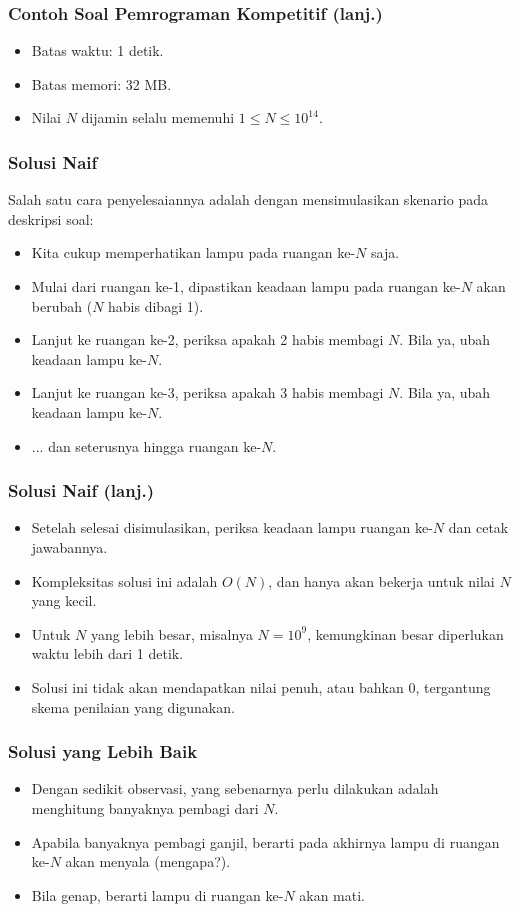 \begin{frame}
\frametitle{Contoh Soal Pemrograman Kompetitif (lanj.)}
\begin{itemize}
  \item Batas waktu: 1 detik.
  \item Batas memori: 32 MB.
  \item Nilai $N$ dijamin selalu memenuhi $1 \leq N \leq 10^{14}$.
\end{itemize}
\end{frame}

\begin{frame}
\frametitle{Solusi Naif}
Salah satu cara penyelesaiannya adalah dengan mensimulasikan skenario pada deskripsi soal:
\begin{itemize}
  \item Kita cukup memperhatikan lampu pada ruangan ke-$N$ saja.
  \item Mulai dari ruangan ke-1, dipastikan keadaan lampu pada ruangan ke-$N$ akan berubah ($N$ habis dibagi 1).
  \item Lanjut ke ruangan ke-2, periksa apakah 2 habis membagi $N$. Bila ya, ubah keadaan lampu ke-$N$.
  \item Lanjut ke ruangan ke-3, periksa apakah 3 habis membagi $N$. Bila ya, ubah keadaan lampu ke-$N$.
  \item ... dan seterusnya hingga ruangan ke-$N$.
\end{itemize}
\end{frame}

\begin{frame}
\frametitle{Solusi Naif (lanj.)}
\begin{itemize}
  \item Setelah selesai disimulasikan, periksa keadaan lampu ruangan ke-$N$ dan cetak jawabannya.
  \item Kompleksitas solusi ini adalah $O(N)$, dan hanya akan bekerja untuk nilai $N$ yang kecil.
  \item Untuk $N$ yang lebih besar, misalnya $N = 10^9$, kemungkinan besar diperlukan waktu lebih dari 1 detik.
  \item Solusi ini tidak akan mendapatkan nilai penuh, atau bahkan 0, tergantung skema penilaian yang digunakan.
\end{itemize}
\end{frame}

\begin{frame}
\frametitle{Solusi yang Lebih Baik}
\begin{itemize}
  \item Dengan sedikit observasi, yang sebenarnya perlu dilakukan adalah menghitung banyaknya pembagi dari $N$.
  \item Apabila banyaknya pembagi ganjil, berarti pada akhirnya lampu di ruangan ke-$N$ akan menyala (mengapa?).
  \item Bila genap, berarti lampu di ruangan ke-$N$ akan mati.
\end{itemize}
\end{frame}

